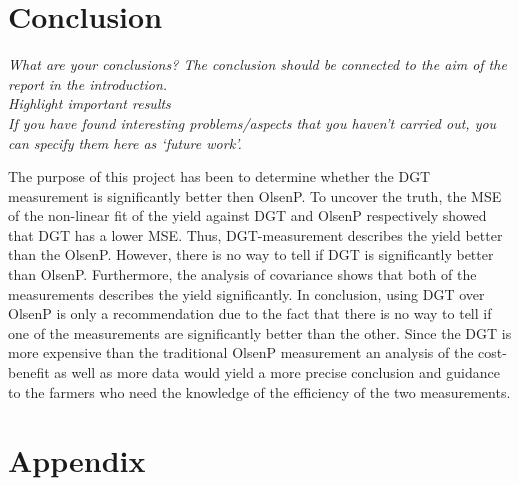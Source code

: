 \documentclass[11pt, fleqn, titlepage]{article}
\begin{document}
\section{Conclusion}
\textit{What are your conclusions? The conclusion should be connected to the aim of the report in the introduction. \\ Highlight important results \\ If you have found interesting problems/aspects that you haven’t carried out, you can specify them here as ‘future work’.}

The purpose of this project has been to determine whether the DGT measurement is significantly better then OlsenP. To uncover the truth, the MSE of the non-linear fit of the yield against DGT and OlsenP respectively showed that DGT has a lower MSE. Thus, DGT-measurement describes the yield better than the OlsenP. However, there is no way to tell if DGT is significantly better than OlsenP. Furthermore, the analysis of covariance shows that both of the measurements describes the yield significantly. In conclusion, using DGT over OlsenP is only a recommendation due to the fact that there is no way to tell if one of the measurements are significantly better than the other. Since the DGT is more expensive than the traditional OlsenP measurement an analysis of the cost-benefit as well as more data would yield a more precise conclusion and guidance to the farmers who need the knowledge of the efficiency of the two measurements.

\section{Appendix}



\end{document}
